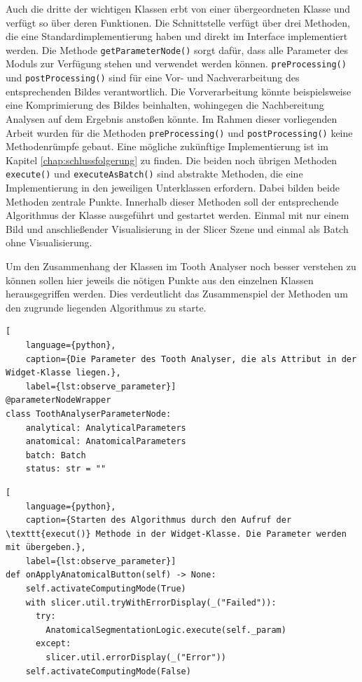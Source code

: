 Auch die dritte der wichtigen Klassen erbt von einer übergeordneten Klasse und verfügt
so über deren Funktionen. Die Schnittstelle verfügt über drei Methoden, die eine
Standardimplementierung haben und direkt im Interface implementiert werden. Die
Methode \texttt{getParameterNode()} sorgt dafür, dass alle Parameter des Moduls
zur Verfügung stehen und verwendet werden können. \texttt{preProcessing()} und
\texttt{postProcessing()} sind für eine Vor- und Nachverarbeitung des
entsprechenden Bildes verantwortlich. Die Vorverarbeitung könnte beispielsweise eine
Komprimierung des Bildes beinhalten, wohingegen die Nachbereitung Analysen auf
dem Ergebnis anstoßen könnte. Im Rahmen dieser vorliegenden Arbeit wurden für die
Methoden \texttt{preProcessing()} und \texttt{postProcessing()} keine Methodenrümpfe
gebaut. Eine mögliche zukünftige Implementierung ist im Kapitel
\ref{chap:schlussfolgerung} zu finden. Die beiden noch übrigen Methoden \texttt{execute()}
und \texttt{executeAsBatch()} sind abstrakte Methoden, die eine Implementierung
in den jeweiligen Unterklassen erfordern. Dabei bilden beide Methoden zentrale Punkte.
Innerhalb dieser Methoden soll der entsprechende Algorithmus der Klasse
ausgeführt und gestartet werden. Einmal mit nur einem Bild und anschließender Visualisierung
in der Slicer Szene und einmal als Batch ohne Visualisierung.

\pagebreak

Um den Zusammenhang der Klassen im Tooth Analyser noch besser verstehen zu
können sollen hier jeweils die nötigen Punkte aus den einzelnen Klassen
herausgegriffen werden. Dies verdeutlicht das Zusammenspiel der Methoden um den zugrunde
liegenden Algorithmus zu starte.

\begin{lstlisting}[
    language={python},
    caption={Die Parameter des Tooth Analyser, die als Attribut in der Widget-Klasse liegen.},
    label={lst:observe_parameter}]
@parameterNodeWrapper
class ToothAnalyserParameterNode:
    analytical: AnalyticalParameters
    anatomical: AnatomicalParameters
    batch: Batch
    status: str = ""
\end{lstlisting}

\begin{lstlisting}[
    language={python},
    caption={Starten des Algorithmus durch den Aufruf der \texttt{execut()} Methode in der Widget-Klasse. Die Parameter werden mit übergeben.},
    label={lst:observe_parameter}]
def onApplyAnatomicalButton(self) -> None:
    self.activateComputingMode(True)
    with slicer.util.tryWithErrorDisplay(_("Failed")):
	  try:
	    AnatomicalSegmentationLogic.execute(self._param)
	  except:
	    slicer.util.errorDisplay(_("Error"))
    self.activateComputingMode(False)
\end{lstlisting}

